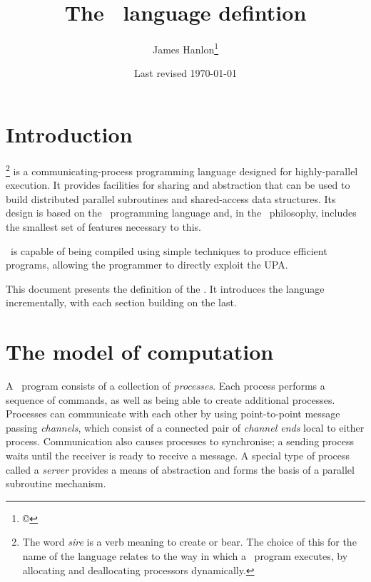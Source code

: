 \documentclass[11pt,a4paper,parskip=half-]{scrartcl}
\title{The \sire\ language defintion}
\author{James Hanlon\footnote{\copyright}}
\date{Last revised \today}
\begin{document}
\maketitle

\setcounter{tocdepth}{2}
\tableofcontents

\clearpage\section{Introduction}

\def\sirewordfootnote{The word \emph{sire} is a verb meaning to create or bear.
The choice of this for the name of the language relates to the way in which a
\sire\ program executes, by allocating and deallocating processors dynamically.}

\emph{\Sire}\footnote{\sirewordfootnote} is a communicating-process programming
language designed for highly-parallel execution.
%
It provides facilities for sharing and abstraction that can be used to
build distributed parallel subroutines and shared-access data structures.
%
Its design is based on the \occam\ programming language and, in the \occam\
philosophy, includes the smallest set of features necessary to this.

\Sire\ is capable of being compiled using simple techniques to produce
efficient programs, allowing the programmer to directly exploit the UPA.

This document presents the definition of the \sire. It introduces the
language incrementally, with each section building on the last.
 

\section{The model of computation}

A \sire\ program consists of a collection of \emph{processes}. Each process
performs a sequence of commands, as well as being able to create additional
processes.
%
Processes can communicate with each other by using point-to-point message
passing \emph{channels}, which consist of a connected pair of \emph{channel
ends} local to either process. Communication also causes processes
to synchronise; a sending process waits until the receiver is ready to receive
a message.
%
A special type of process called a \emph{server} provides a means of
abstraction and forms the basis of a parallel subroutine mechanism.
\end{document}
